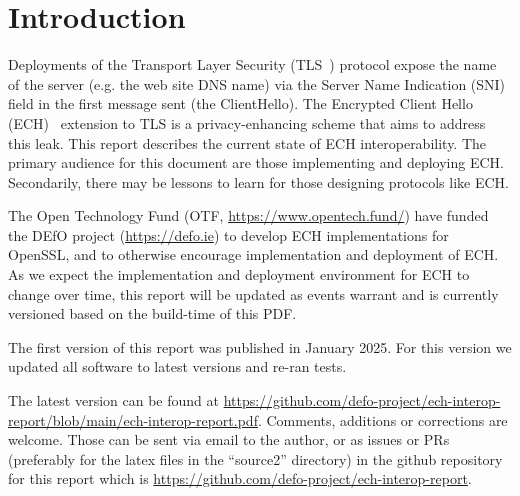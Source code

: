 \section{Introduction}

Deployments of the Transport Layer Security (TLS~\cite{rfc8446}) protocol
expose the name of the server (e.g. the web site DNS name) via the Server Name
Indication (SNI) field in the first message sent (the ClientHello).  The
Encrypted Client Hello (ECH)~\cite{ietf-tls-esni} extension to TLS is a
privacy-enhancing scheme that aims to address this leak.
This report describes the current state of ECH interoperability.
The primary audience for this document are those implementing and
deploying ECH. Secondarily, there may be lessons to learn for those
designing protocols like ECH.

The Open Technology Fund (OTF, \url{https://www.opentech.fund/}) have
funded the DEfO project (\url{https://defo.ie}) to develop
ECH implementations for OpenSSL, and to otherwise encourage implementation
and deployment of ECH.
As we expect the implementation and deployment environment for ECH to change
over time, this report will be updated as events warrant and is currently
versioned based on the build-time of this PDF.

The first version of this report was published in January 2025. \cite{echinterop1}
For this version we updated all software to latest versions and re-ran tests.

The latest version can be found at
\url{https://github.com/defo-project/ech-interop-report/blob/main/ech-interop-report.pdf}.
Comments, additions or corrections are welcome. Those can be sent via email to
the author, or as issues or PRs (preferably for the latex files in the
``source2'' directory) in the github repository for this report which is
\url{https://github.com/defo-project/ech-interop-report}.
